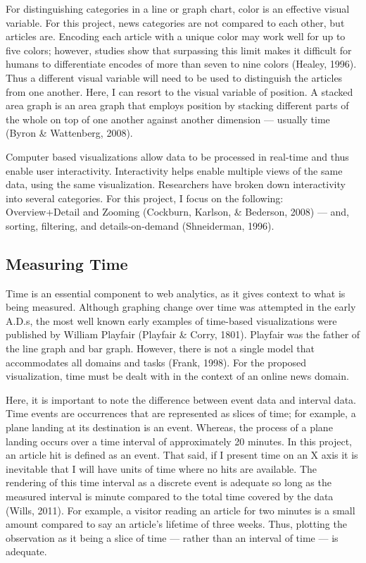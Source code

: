 \documentclass[12pt]{article}
\begin{document}
For distinguishing categories in a line or graph chart, color is an effective visual variable. For this project, news categories are not compared to each other, but articles are. Encoding each article with a unique color may work well for up to five colors; however, studies show that surpassing this limit makes it difficult for humans to differentiate encodes of more than seven to nine colors (Healey, 1996). Thus a different visual variable will need to be used to distinguish the articles from one another. Here, I can resort to the visual variable of position. A stacked area graph is an area graph that employs position by stacking different parts of the whole on top of one another against another dimension --- usually time (Byron \& Wattenberg, 2008).  

Computer based visualizations allow data to be processed in real-time and thus enable user interactivity. Interactivity helps enable multiple views of the same data, using the same visualization. Researchers have broken down interactivity into several categories. For this project, I focus on the following: Overview+Detail and Zooming (Cockburn, Karlson, \& Bederson, 2008) --- and, sorting, filtering, and details-on-demand (Shneiderman, 1996). 


\subsection{Measuring Time}
Time is an essential component to web analytics, as it gives context to what is being measured. Although graphing change over time was attempted in the early A.D.s, the most well known early examples of time-based visualizations were published by William Playfair (Playfair \& Corry, 1801). Playfair was the father of the line graph and bar graph. However, there is not a single model that accommodates all domains and tasks (Frank, 1998). For the proposed visualization, time must be dealt with in the context of an online news domain.   

Here, it is important to note the difference between event data and interval data. Time events are occurrences that are represented as slices of time; for example, a plane landing at its destination is an event. Whereas, the process of a plane landing occurs over a time interval of approximately 20 minutes. In this project, an article hit is defined as an event. That said, if I present time on an X axis it is inevitable that I will have units of time where no hits are available. The rendering of this time interval as a discrete event is adequate so long as the measured interval is minute compared to the total time covered by the data (Wills, 2011). For example, a visitor reading an article for two minutes is a small amount compared to say an article's lifetime of three weeks. Thus, plotting the observation as it being a slice of time --- rather than an interval of time --- is adequate.  
\end{document}
